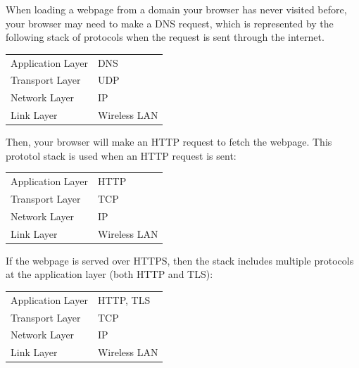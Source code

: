 \documentclass{article}
\begin{document}
  \begin{example}
  When loading a webpage from a domain your browser has never visited before, your browser may need to make a DNS request, which is represented by the following stack of protocols when the request is sent through the internet. 
  \begin{center}
  \begin{tabular}{l|l}
      Application Layer & DNS\\
      Transport Layer & UDP \\
      Network Layer & IP \\
      Link Layer & Wireless LAN
  \end{tabular}
  \end{center}
  Then, your browser will make an HTTP request to fetch the webpage. This prototol stack is used when an HTTP request is sent:
  \begin{center}
  \begin{tabular}{l|l}
      Application Layer & HTTP\\
      Transport Layer & TCP \\
      Network Layer & IP \\
      Link Layer & Wireless LAN
  \end{tabular}
  \end{center}
  If the webpage is served over HTTPS, then the stack includes multiple protocols at the application layer (both HTTP and TLS): 
  \begin{center}
  \begin{tabular}{l|l}
      Application Layer & HTTP, TLS\\
      Transport Layer & TCP \\
      Network Layer & IP \\
      Link Layer & Wireless LAN
  \end{tabular}
  \end{center}
  \end{example}
\end{document}
